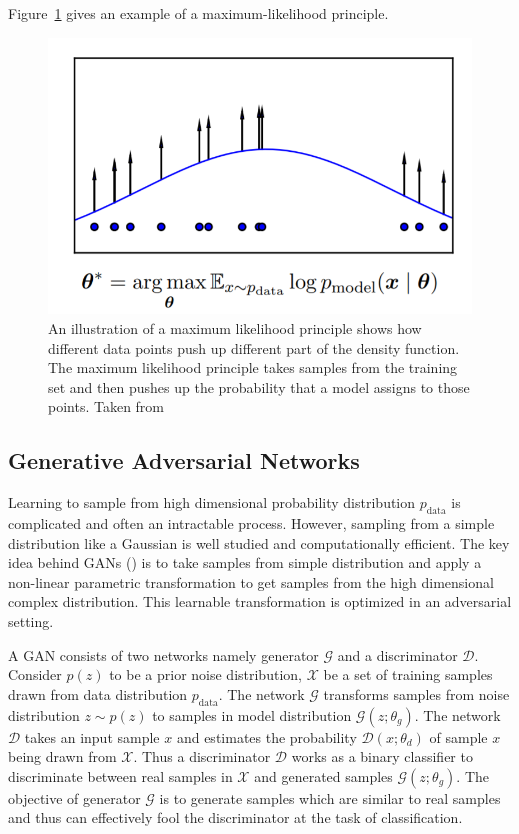 Figure~\ref{fig:mll} gives an example of a maximum-likelihood principle.
\begin{figure}
    \centering
    \includegraphics[width=0.45\columnwidth]{master_thesis_template/figs/mll.PNG}
    \caption[Maximum Likelihood Principle]{An illustration of a maximum likelihood principle shows how different data points push up different part of the density function. The maximum likelihood principle takes samples from the training set and then pushes up the probability that a model assigns to those points. Taken from \citet{goodfellow2016nips}}
    \label{fig:mll}
\end{figure}

\subsection{Generative Adversarial Networks}
\label{subsec:gan}
Learning to sample from high dimensional probability distribution $p_\text{data}$ is complicated and often an intractable process. However, sampling from a simple distribution like a Gaussian is well studied and computationally efficient. 
The key idea behind GANs (\cite{goodfellow2014generative}) is to take samples from simple distribution and apply a non-linear parametric transformation to get samples from the high dimensional complex distribution. This learnable transformation is optimized in an adversarial setting.

A GAN consists of two networks namely generator $\mathcal{G}$ and a discriminator $\mathcal{D}$. Consider $p(z)$ to be a prior noise distribution, $\mathcal{X}$ be a set of training samples drawn from data distribution $p_\text{data}$. The network $\mathcal{G}$ transforms samples from noise distribution $z\sim p(z)$ to samples in model distribution $\mathcal{G}(z;\theta_g)$. The network $\mathcal{D}$ takes an input sample $x$ and estimates the probability $\mathcal{D}(x;\theta_d)$ of sample $x$ being drawn from $\mathcal{X}$. Thus a discriminator $\mathcal{D}$ works as a binary classifier to discriminate between real samples in $\mathcal{X}$ and generated samples $\mathcal{G}(z;\theta_g)$. The objective of generator $\mathcal{G}$ is to generate samples which are similar to real samples and thus can effectively fool the discriminator at the task of classification. 

